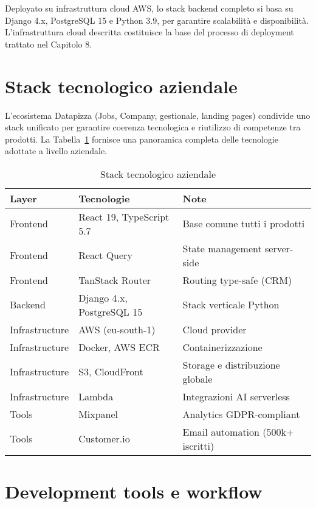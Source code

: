 Deployato su infrastruttura cloud AWS, lo stack backend completo si basa su 
Django 4.x, PostgreSQL 15 e Python 3.9, per garantire scalabilità e disponibilità. 
L'infrastruttura cloud descritta costituisce la base del processo di deployment 
trattato nel Capitolo 8.

\section{Stack tecnologico aziendale}

L'ecosistema Datapizza (Jobs, Company, gestionale, landing pages) condivide 
uno stack unificato per garantire coerenza tecnologica e riutilizzo di competenze 
tra prodotti. La Tabella~\ref{tab:stack-aziendale} fornisce una panoramica 
completa delle tecnologie adottate a livello aziendale.

\begin{table}[h]
\centering
\caption{Stack tecnologico aziendale}
\label{tab:stack-aziendale}
\begin{tabular}{|l|l|p{6.5cm}|}
\hline
\textbf{Layer} & \textbf{Tecnologie} & \textbf{Note} \\
\hline
Frontend & React 19, TypeScript 5.7 & Base comune tutti i prodotti \\
\hline
Frontend & React Query & State management server-side \\
\hline
Frontend & TanStack Router & Routing type-safe (CRM) \\
\hline
Backend & Django 4.x, PostgreSQL 15 & Stack verticale Python \\
\hline
Infrastructure & AWS (eu-south-1) & Cloud provider \\
\hline
Infrastructure & Docker, AWS ECR & Containerizzazione \\
\hline
Infrastructure & S3, CloudFront & Storage e distribuzione globale \\
\hline
Infrastructure & Lambda & Integrazioni AI serverless \\
\hline
Tools & Mixpanel & Analytics GDPR-compliant \\
\hline
Tools & Customer.io & Email automation (500k+ iscritti) \\
\hline
\end{tabular}
\end{table}

\section{Development tools e workflow}

